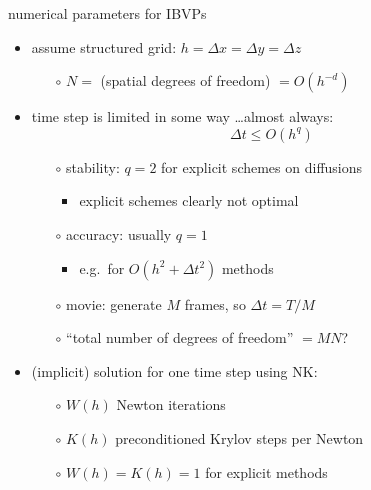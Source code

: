 \documentclass[hide notes,intlimits,usenames,dvipsnames]{beamer}
\begin{document}
\begin{frame}{numerical parameters for IBVPs}

\begin{itemize}
\item assume structured grid: $h=\Delta x = \Delta y=\Delta z$
    \begin{itemize}
    \item[$\circ$] $N=$ (spatial degrees of freedom) $=O(h^{-d})$
    \end{itemize}
\item time step is limited in some way \dots almost always:
    $$\Delta t \le O(h^q)$$
    \vspace{-5mm}
    \begin{itemize}
    \item[$\circ$] stability: $q=2$ for explicit schemes on diffusions
	    \begin{itemize}
	    \item explicit schemes clearly not optimal
	    \end{itemize}
    \item[$\circ$] accuracy: usually $q=1$
	    \begin{itemize}
	    \item e.g.~for $O(h^2+\Delta t^2)$ methods
	    \end{itemize}
    \item[$\circ$] movie: generate $M$ frames, so $\Delta t = T/M$
    \item[$\circ$] ``total number of degrees of freedom'' $=M N$?
    \end{itemize}
\item (implicit) solution for one time step using NK:
    \begin{itemize}
    \item[$\circ$] $W(h)$ Newton iterations
    \item[$\circ$] $K(h)$ preconditioned Krylov steps per Newton
    \item[$\circ$] $W(h)=K(h)=1$ for explicit methods
    \end{itemize}
\end{itemize}
\end{frame}
\end{document}
